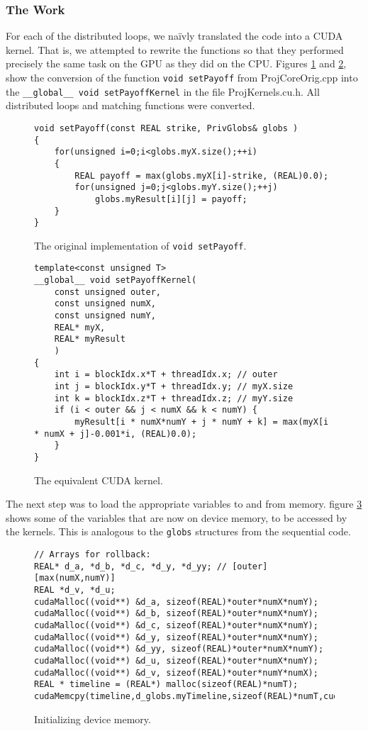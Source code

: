 \documentclass[]{report}
\begin{document}
\subsubsection{The Work}
For each of the distributed loops, we na\"ivly translated the code into a CUDA kernel. That is, we attempted to rewrite the functions so that they performed precisely the same task on the GPU as they did on the CPU. Figures \ref{fig:nokernel} and \ref{fig:yeskernel}, show the conversion of the function \texttt{void setPayoff} from ProjCoreOrig.cpp into the \texttt{\_\_global\_\_ void setPayoffKernel} in the file ProjKernels.cu.h. All distributed loops and matching functions were converted.
 \begin{figure}[h]
	\begin{lstlisting}
void setPayoff(const REAL strike, PrivGlobs& globs )
{
	for(unsigned i=0;i<globs.myX.size();++i)
	{
		REAL payoff = max(globs.myX[i]-strike, (REAL)0.0);
		for(unsigned j=0;j<globs.myY.size();++j)
			globs.myResult[i][j] = payoff;
	}
}
	\end{lstlisting}
	\caption{ \label{fig:nokernel} The original implementation of \texttt{void setPayoff}.}
\end{figure}
\begin{figure}[h]
	\begin{lstlisting}
template<const unsigned T>
__global__ void setPayoffKernel(
	const unsigned outer,
	const unsigned numX,
	const unsigned numY,
	REAL* myX,
	REAL* myResult
	)
{
	int i = blockIdx.x*T + threadIdx.x; // outer
	int j = blockIdx.y*T + threadIdx.y; // myX.size
	int k = blockIdx.z*T + threadIdx.z; // myY.size
	if (i < outer && j < numX && k < numY) {
		myResult[i * numX*numY + j * numY + k] = max(myX[i * numX + j]-0.001*i, (REAL)0.0);
	}
}
	\end{lstlisting}
	\caption{ \label{fig:yeskernel} The equivalent CUDA kernel.}
\end{figure}

The next step was to load the appropriate variables to and from memory. figure \ref{fig:cudamemcopy} shows some of the variables that are now on device memory, to be accessed by the kernels. This is analogous to the \texttt{globs} structures from the sequential code.

\begin{figure}[h]
	\begin{lstlisting}
// Arrays for rollback:
REAL* d_a, *d_b, *d_c, *d_y, *d_yy; // [outer][max(numX,numY)]
REAL *d_v, *d_u;
cudaMalloc((void**) &d_a, sizeof(REAL)*outer*numX*numY);
cudaMalloc((void**) &d_b, sizeof(REAL)*outer*numX*numY);
cudaMalloc((void**) &d_c, sizeof(REAL)*outer*numX*numY);
cudaMalloc((void**) &d_y, sizeof(REAL)*outer*numX*numY);
cudaMalloc((void**) &d_yy, sizeof(REAL)*outer*numX*numY);
cudaMalloc((void**) &d_u, sizeof(REAL)*outer*numX*numY);
cudaMalloc((void**) &d_v, sizeof(REAL)*outer*numY*numX);
REAL * timeline = (REAL*) malloc(sizeof(REAL)*numT);
cudaMemcpy(timeline,d_globs.myTimeline,sizeof(REAL)*numT,cudaMemcpyDeviceToHost);
	\end{lstlisting}
	\caption{ \label{fig:cudamemcopy} Initializing device memory.}
\end{figure}
\end{document}

